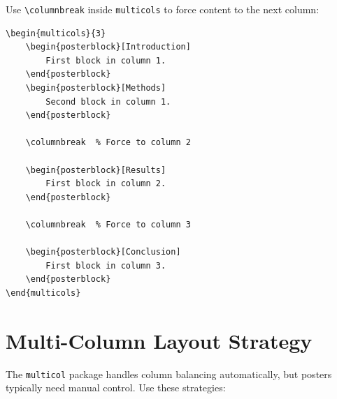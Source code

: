 Use \texttt{\textbackslash columnbreak} inside \texttt{multicols} to force
content to the next column:

\begin{verbatim}
\begin{multicols}{3}
    \begin{posterblock}[Introduction]
        First block in column 1.
    \end{posterblock}
    \begin{posterblock}[Methods]
        Second block in column 1.
    \end{posterblock}

    \columnbreak  % Force to column 2

    \begin{posterblock}[Results]
        First block in column 2.
    \end{posterblock}

    \columnbreak  % Force to column 3

    \begin{posterblock}[Conclusion]
        First block in column 3.
    \end{posterblock}
\end{multicols}
\end{verbatim}

\section{Multi-Column Layout Strategy}

The \texttt{multicol} package handles column balancing automatically, but
posters typically need manual control.  Use these strategies:

